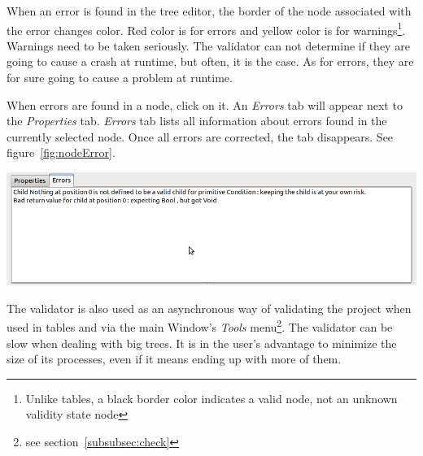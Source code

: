 \documentclass[a4paper,11pt]{report}
\begin{document}
When an error is found in the tree editor, the border of the node associated with the error changes color. Red color is for errors and yellow color is for warnings\footnote{Unlike tables, a black border color indicates a valid node, not an unknown validity state node}. Warnings need to be taken seriously. The validator can not determine if they are going to cause a crash at runtime, but often, it is the case. As for errors, they are for sure going to cause a problem at runtime.

When errors are found in a node, click on it. An \emph{Errors} tab will appear next to the \emph{Properties} tab. \emph{Errors} tab lists all information about errors found in the currently selected node. Once all errors are corrected, the tab disappears. See figure~\ref{fig:nodeError}.

\begin{center}
\includegraphics[scale=0.4]{Pictures/TreeEditor/nodeError.png}
\label{fig:nodeError}
\end{center}

The validator is also used as an asynchronous way of validating the project when used in tables and via the main Window's \emph{Tools} menu\footnote{see section~\ref{subsubsec:check}}. The validator can be slow when dealing with big trees. It is in the user's advantage to minimize the size of its processes, even if it means ending up with more of them.
\end{document}

